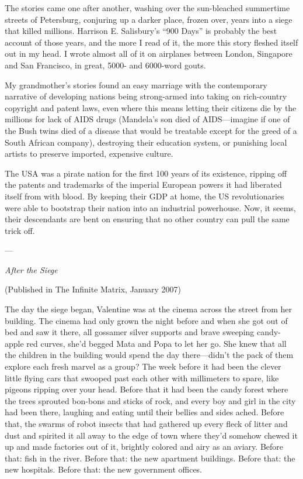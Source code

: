 The stories came one after another, washing over the sun-bleached
summertime streets of Petersburg, conjuring up a darker place,
frozen over, years into a siege that killed millions. Harrison E.
Salisbury’s “900 Days” is probably the best account of those years,
and the more I read of it, the more this story fleshed itself out
in my head. I wrote almost all of it on airplanes between London,
Singapore and San Francisco, in great, 5000- and 6000-word gouts.

My grandmother’s stories found an easy marriage with the
contemporary narrative of developing nations being strong-armed
into taking on rich-country copyright and patent laws, even where
this means letting their citizens die by the millions for lack of
AIDS drugs (Mandela’s son died of AIDS—imagine if one of the Bush
twins died of a disease that would be treatable except for the
greed of a South African company), destroying their education
system, or punishing local artists to preserve imported, expensive
culture.

The USA was a pirate nation for the first 100 years of its
existence, ripping off the patents and trademarks of the imperial
European powers it had liberated itself from with blood. By keeping
their GDP at home, the US revolutionaries were able to bootstrap
their nation into an industrial powerhouse. Now, it seems, their
descendants are bent on ensuring that no other country can pull the
same trick off.

—

\emph{After the Siege}

(Published in The Infinite Matrix, January 2007)

The day the siege began, Valentine was at the cinema across the
street from her building. The cinema had only grown the night
before and when she got out of bed and saw it there, all gossamer
silver supports and brave sweeping candy-apple red curves, she’d
begged Mata and Popa to let her go. She knew that all the children
in the building would spend the day there—didn’t the pack of them
explore each fresh marvel as a group? The week before it had been
the clever little flying cars that swooped past each other with
millimeters to spare, like pigeons ripping over your head. Before
that it had been the candy forest where the trees sprouted bon-bons
and sticks of rock, and every boy and girl in the city had been
there, laughing and eating until their bellies and sides ached.
Before that, the swarms of robot insects that had gathered up every
fleck of litter and dust and spirited it all away to the edge of
town where they’d somehow chewed it up and made factories out of
it, brightly colored and airy as an aviary. Before that: fish in
the river. Before that: the new apartment buildings. Before that:
the new hospitals. Before that: the new government offices.

